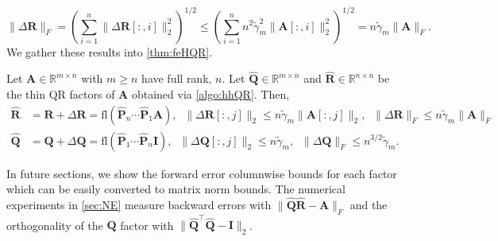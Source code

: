 \documentclass[review,onefignum,onetabnum]{siamart190516}
\newcommand{\R}{\mathbb{R}}
\newcommand{\bb}[1]{\mathbf{#1}}
\newcommand{\fl}{\mathrm{fl}}
\begin{document}
\begin{equation*}
\|\Delta \bb{R} \|_F = \left(\sum_{i=1}^n \|\Delta \bb{R}[:,i]\|_2^2\right)^{1/2} \leq \left(\sum_{i=1}^n n^2\tilde{\gamma}_{m}^2 \|\bb{A}[:,i]\|_2^2\right)^{1/2} = n\tilde{\gamma}_{m} \|\bb{A}\|_F.
\end{equation*}
We gather these results into \cref{thm:feHQR}.
\begin{theorem}
	\label{thm:feHQR}
	Let $\bb{A}\in\R^{m\times n}$ with $m\geq n$ have full rank, $n$. 
	Let $\hat{\bb{Q}}\in\R^{m\times n}$ and $\hat{\bb{R}}\in\R^{n\times n}$ be the thin QR factors of $\bb{A}$ obtained via \cref{algo:hhQR}.
	Then,
	\begin{align*}
	\hat{\bb{R}} &= \bb{R} + \Delta \bb{R} = \fl(\hat{\bb{P}}_n\cdots\hat{\bb{P}}_1 \bb{A}),\;\; \|\Delta \bb{R}[:,j]\|_2\leq n\tilde{\gamma}_{m} \|\bb{A}[:,j]\|_2,\;\; \|\Delta \bb{R}\|_F\leq n\tilde{\gamma}_{m} \|\bb{A}\|_F\\
	\hat{\bb{Q}} &= \bb{Q} + \Delta \bb{Q} = \fl(\hat{\bb{P}}_1\cdots\hat{\bb{P}}_n \bb{I}),\;\; \|\Delta \bb{Q}[:,j]\|_2\leq n\tilde{\gamma}_{m},\;\; \|\Delta \bb{Q}\|_F \leq n^{3/2} \tilde{\gamma}_{m}.
	\end{align*}
\end{theorem}
In future sections, we show the forward error columnwise bounds for each factor which can be easily converted to matrix norm bounds.
The numerical experiments in \cref{sec:NE} measure backward errors with $\|\hat{\bb{Q}}\hat{\bb{R}}-\bb{A}\|_F$ and the orthogonality of the $\bb{Q}$ factor with $\|\hat{\bb{Q}}^{\top}\hat{\bb{Q}}-\bb{I}\|_2$.
\end{document}
